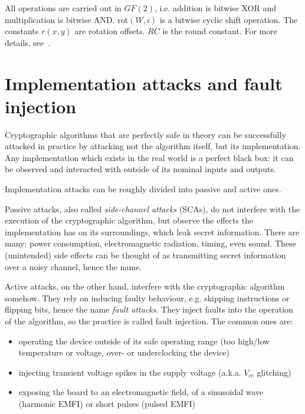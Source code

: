 \documentclass[times, utf8, diplomski]{fer}
\begin{document}
All operations are carried out in $GF(2)$, i.e. addition is bitwise XOR and
multiplication is bitwise AND. rot$(W,i)$ is a bitwise cyclic shift operation.
The constants $r(x,y)$ are rotation offsets. $RC$ is the round constant.
For more details, see~\cite{keccak_reference}.



\section{Implementation attacks and fault injection}
Cryptographic algorithms that are perfectly safe in theory can be successfully
attacked in practice by attacking not the algorithm itself, but its implementation.
Any implementation which exists in the real world is a perfect black box: it can
be observed and interacted with outside of its nominal inputs and outputs.

Implementation attacks can be roughly divided into passive and active ones.

Passive attacks, also called \emph{side-channel attacks} (SCAs), do not interfere
with the execution of the cryptographic algorithm, but observe the effects the
implementation has on its surroundings, which leak secret information.
There are many: power consumption, electromagnetic radiation, timing, even sound. %
These (unintended) side effects can be thought of as transmitting secret
information over a noisy channel, hence the name.

Active attacks, on the other hand, interfere with the cryptographic algorithm
somehow. They rely on inducing faulty behaviour, e.g. skipping instructions or
flipping bits, hence the name \emph{fault attacks}. They inject faults into the
operation of the algorithm, so the practice is called fault injection.
The common ones are:
\begin{itemize}
  \item operating the device outside of its safe operating range
        (too high/low temperature or voltage, over- or underclocking the device)
  \item injecting transient voltage spikes in the supply voltage (a.k.a. $V_{cc}$ glitching)
  \item exposing the board to an electromagnetic field, of a sinusoidal wave (harmonic EMFI)
        or short pulses (pulsed EMFI)
\end{itemize}

\end{document}
